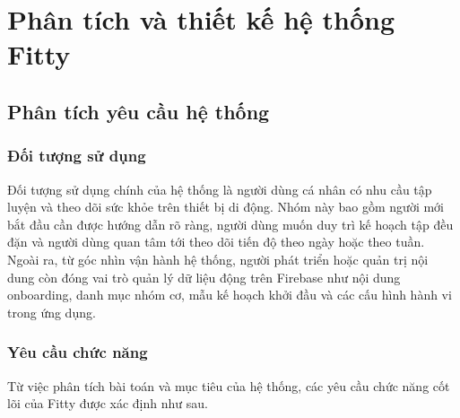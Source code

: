 ﻿\chapter{Phân tích và thiết kế hệ thống Fitty}

\section{Phân tích yêu cầu hệ thống}

\subsection{Đối tượng sử dụng}

Đối tượng sử dụng chính của hệ thống là người dùng cá nhân có nhu cầu tập luyện và theo dõi sức khỏe trên thiết bị di động. Nhóm này bao gồm người mới bắt đầu cần được hướng dẫn rõ ràng, người dùng muốn duy trì kế hoạch tập đều đặn và người dùng quan tâm tới theo dõi tiến độ theo ngày hoặc theo tuần. Ngoài ra, từ góc nhìn vận hành hệ thống, người phát triển hoặc quản trị nội dung còn đóng vai trò quản lý dữ liệu động trên Firebase như nội dung onboarding, danh mục nhóm cơ, mẫu kế hoạch khởi đầu và các cấu hình hành vi trong ứng dụng.

\subsection{Yêu cầu chức năng}

Từ việc phân tích bài toán và mục tiêu của hệ thống, các yêu cầu chức năng cốt lõi của Fitty được xác định như sau.

